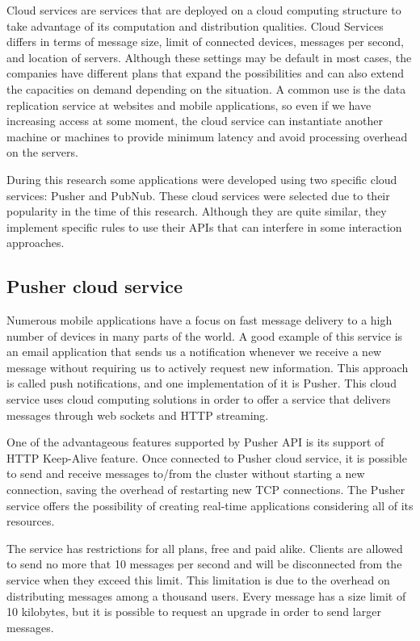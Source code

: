 Cloud services are services that are deployed on a cloud computing structure to take advantage of its computation and distribution qualities.
Cloud Services differs in terms of message size, limit of connected devices, messages per second, and location of servers.
Although these settings may be default in most cases, the companies have different plans that expand the possibilities and can also extend the capacities on demand depending on the situation.
A common use is the data replication service at websites and mobile applications, so even if we have increasing access at some moment, the cloud service can instantiate another machine or machines to provide minimum latency and avoid processing overhead on the servers.

During this research some applications were developed using two specific cloud services: Pusher and PubNub.
These cloud services were selected due to their popularity in the time of this research.
Although they are quite similar, they implement specific rules to use their APIs that can interfere in some interaction approaches.

\subsection*{Pusher cloud service}

Numerous mobile applications have a focus on fast message delivery to a high number of devices in many parts of the world.
A good example of this service is an email application that sends us a notification whenever we receive a new message without requiring us to actively request new information.
This approach is called push notifications, and one implementation of it is Pusher.
This cloud service uses cloud computing solutions in order to offer a service that delivers messages through web sockets and HTTP streaming.

One of the advantageous features supported by Pusher API is its support of HTTP Keep-Alive feature. 
Once connected to Pusher cloud service, it is possible to send and receive messages to/from the cluster without starting a new connection, saving the overhead of restarting new TCP connections.
The Pusher service offers the possibility of creating real-time applications considering all of its resources.

The service has restrictions for all plans, free and paid alike.
Clients are allowed to send no more that 10 messages per second and will be disconnected from the service when they exceed this limit.
This limitation is due to the overhead on distributing messages among a thousand users.
Every message has a size limit of 10 kilobytes, but it is possible to request an upgrade in order to send larger messages.

